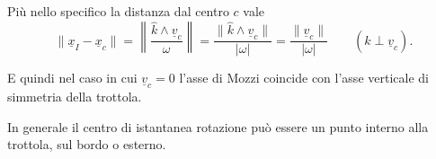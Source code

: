 \begin{example}{}
\begin{figure}
\end{figure}

Più nello specifico la distanza dal centro $c$ vale
\[
\|\underline{x}_I-\underline{x}_c\|
=
\left\|\frac{\hat{k}\wedge \underline{v}_c}{\omega}\right\|
=
\frac{\|\hat{k}\wedge \underline{v}_c\|}{|\omega|}
=
\frac{\|\underline{v}_c\|}{|\omega|}
\qquad
(\hat{k}\perp \underline{v}_c).
\]

E quindi nel caso in cui $\underline{v}_c=0$ l'asse di Mozzi coincide con
l'asse verticale di simmetria della trottola.

In generale il centro di istantanea rotazione può essere un punto interno
alla trottola, sul bordo o esterno.
\end{example}
